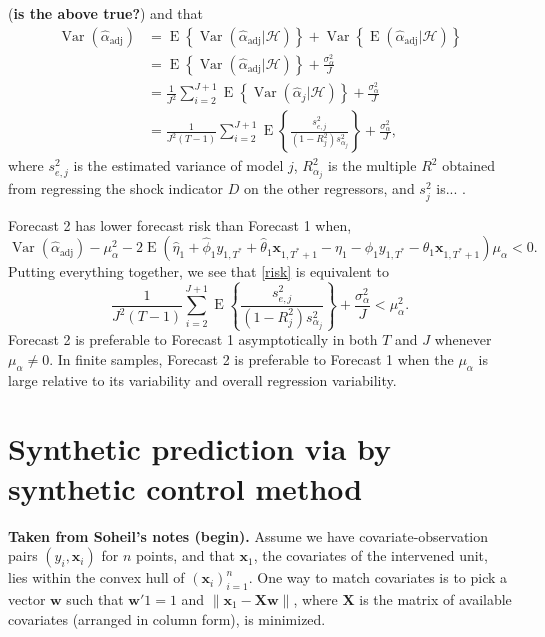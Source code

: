 \documentclass[11pt]{article}
\newcommand{\w}{\textbf{w}}
\newcommand{\x}{\textbf{x}}
\newcommand{\X}{\textbf{X}}
\newcommand{\Hist}{\mathcal{H}}
\newcommand{\norm}[1]{\left\lVert#1\right\rVert}
\DeclareMathOperator{\E}{E}
\DeclareMathOperator{\Var}{Var}
\begin{document}
(\textbf{is the above true?}) and that 
\begin{align*}
  \Var(\hat{\alpha}_{\text{adj}}) &= \E\left\{\Var(\hat{\alpha}_{\text{adj}}|\Hist)\right\} 
    + \Var\left\{\E(\hat{\alpha}_{\text{adj}}|\Hist)\right\} \\
  &= \E\left\{\Var(\hat{\alpha}_{\text{adj}}|\Hist)\right\} + \frac{\sigma_{\alpha}^2}{J} \\
  &= \frac{1}{J^2} \sum_{i=2}^{J+1} \E\left\{\Var(\hat{\alpha}_j|\Hist)\right\} + \frac{\sigma_{\alpha}^2}{J} \\
  &= \frac{1}{J^2(T-1)}\sum_{i=2}^{J+1} \E\left\{\frac{s_{e,j}^2}{(1-R^2_j)s_{\alpha_j}^2}\right\} 
    + \frac{\sigma_{\alpha}^2}{J},
\end{align*}
where $s_{e,j}^2$ is the estimated variance of model $j$, $R^2_{\alpha_j}$ is 
the multiple $R^2$ obtained from regressing the shock indicator $D$ on the 
other regressors, and $s_j^2$ is... .

Forecast 2 has lower forecast risk than Forecast 1 when,  
\begin{equation} \label{risk}
  \Var(\hat{\alpha}_{\text{adj}}) - \mu_{\alpha}^2 
    - 2\E\left(\hat\eta_1 + \hat\phi_1 y_{1,T^*} + \hat\theta_1 \x_{1,T^*+1} -\eta_1 - \phi_1 y_{1,T^*} 
      - \theta_1 \x_{1,T^*+1}\right)\mu_{\alpha} < 0.
\end{equation}
Putting everything together, we see that \eqref{risk} is equivalent to
$$
  \frac{1}{J^2(T-1)}\sum_{i=2}^{J+1} \E\left\{\frac{s_{e,j}^2}{(1-R^2_j)s_{\alpha_j}^2}\right\} 
    + \frac{\sigma_{\alpha}^2}{J} < \mu_{\alpha}^2.
$$
Forecast 2 is preferable to Forecast 1 asymptotically in both $T$ and $J$ 
whenever $\mu_{\alpha} \neq 0$. In finite samples, Forecast 2 is preferable to 
Forecast 1 when the $\mu_{\alpha}$ is large relative to its variability and 
overall regression variability.  














\section{Synthetic prediction via by synthetic control method}


{\bf Taken from Soheil's notes (begin).}
Assume we have covariate-observation pairs $(y_i, \x_i)$ for $n$ points, and 
that $\x_1$, the covariates of the intervened unit, lies within the convex hull 
of $(\x_i)_{i=1}^n$. One way to match covariates is to pick a vector $\w$ such 
that $\w'1=1$ and $\norm{\x_1 - \X\w}$, where $\X$ is the matrix of available 
covariates (arranged in column form), is minimized.
\end{document}
